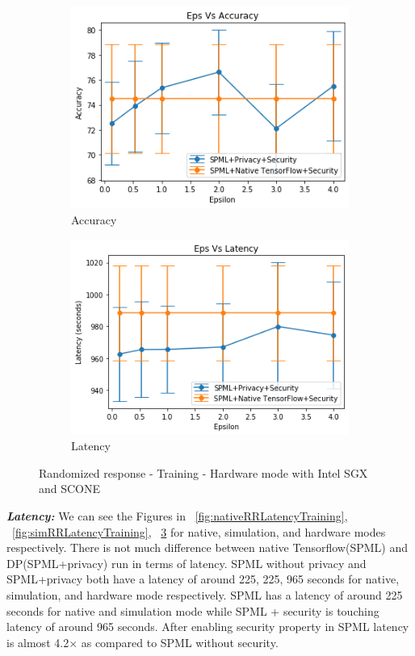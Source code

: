 \begin{figure}
        \label{default}
     \begin{subfigure}{0.5\textwidth}
         \includegraphics[width=\textwidth]{images/Training/RRHWAccuracy.png}
         \caption{Accuracy}
         \label{fig:hwRRAccuracyTraining}
     \end{subfigure}
     \begin{subfigure}{0.5\textwidth}
         \includegraphics[width=\textwidth]{images/Training/RRHWLatency.png}
         \caption{Latency}
         \label{fig:hwRRLatencyTraining}
     \end{subfigure}
        \caption{Randomized response - Training - Hardware mode with Intel SGX and SCONE}
\end{figure}
\newline
\newline
\textbf{\textit{Latency: }}We can see the Figures in ~\ref{fig:nativeRRLatencyTraining}, ~\ref{fig:simRRLatencyTraining}, ~\ref{fig:hwRRLatencyTraining} for native, simulation, and hardware modes respectively. There is not much difference between native Tensorflow(SPML) and DP(SPML+privacy) run in terms of latency. SPML without privacy and SPML+privacy both have a latency of around 225, 225, 965 seconds for native, simulation, and hardware mode respectively. SPML has a latency of around 225 seconds for native and simulation mode while SPML + security is touching latency of around 965 seconds. After enabling security property in SPML latency is almost 4.2$\times$ as compared to SPML without security.
